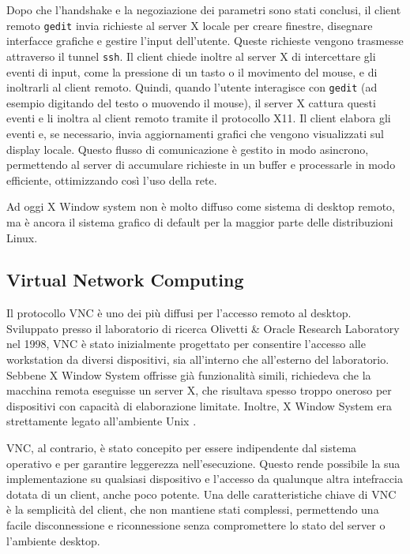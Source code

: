 \documentclass[12pt,a4paper,openright,twoside]{book}
\begin{document}
Dopo che l'handshake e la negoziazione dei parametri sono stati conclusi,
il client remoto \texttt{gedit} invia richieste al server X locale per creare finestre, disegnare interfacce grafiche e gestire l'input dell'utente.
%
Queste richieste vengono trasmesse attraverso il tunnel \texttt{ssh}.
%
Il client chiede inoltre al server X di intercettare gli eventi di input, come la pressione di un tasto o il movimento del mouse, e di inoltrarli al client remoto.
%
Quindi, quando l'utente interagisce con \texttt{gedit} (ad esempio digitando del testo o muovendo il mouse),
il server X cattura questi eventi e li inoltra al client remoto tramite il protocollo X11.
%
Il client elabora gli eventi e, se necessario, invia aggiornamenti grafici che vengono visualizzati sul display locale.
%
Questo flusso di comunicazione è gestito in modo asincrono, permettendo al server di accumulare richieste in un buffer e processarle in modo efficiente, ottimizzando così l'uso della rete.

Ad oggi X Window system non è molto diffuso come sistema di desktop remoto, ma è ancora il sistema grafico di default per la maggior parte delle distribuzioni Linux.

\subsection{Virtual Network Computing}
Il protocollo \ac{VNC} è uno dei più diffusi per l'accesso remoto al desktop.
%
Sviluppato presso il laboratorio di ricerca Olivetti \& Oracle Research Laboratory nel 1998,
\ac{VNC} è stato inizialmente progettato per consentire l'accesso alle workstation da diversi dispositivi,
sia all'interno che all'esterno del laboratorio.
Sebbene X Window System offrisse già funzionalità simili, richiedeva che la macchina remota eseguisse un server X,
che risultava spesso troppo oneroso per dispositivi con capacità di elaborazione limitate. Inoltre, X Window System era strettamente legato all'ambiente Unix \cite{richardson1998vnc}.

\ac{VNC}, al contrario, è stato concepito per essere indipendente dal sistema operativo e per garantire leggerezza nell'esecuzione.
Questo rende possibile la sua implementazione su qualsiasi dispositivo e l'accesso da qualunque altra intefraccia dotata di un client,
anche poco potente.
%
Una delle caratteristiche chiave di \ac{VNC} è la semplicità del client, che non mantiene stati complessi,
permettendo una facile disconnessione e riconnessione senza compromettere lo stato del server o l'ambiente desktop.
\end{document}
